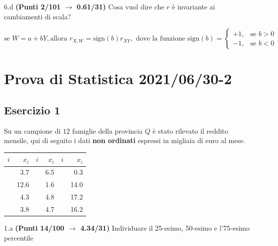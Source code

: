 \documentclass[
  11pt,
]{book}
\theoremstyle{mytheoremstyle}
\theoremstyle{mydefstyle}
\newenvironment{sol}
  {
  \begin{tcolorbox}[enhanced,breakable,arc=0.1mm,boxrule=1pt,colback=white,colframe=iblue,
  title=\bf \fontfamily{lmss}\selectfont \hspace{.5 cm} Soluzione,drop fuzzy shadow]

}{
\end{tcolorbox}
  }
\begin{document}
6.d \textbf{(Punti 2/101 \(\rightarrow\) 0.61/31)} Cosa vuol dire che \(r\) è invariante ai cambiamenti di scala?

\begin{sol}
\[\text{se }W=a+bY,\text{allora }r_{X,W}=\text{sign}(b) r_{XY},\text{ dove la funzione sign}(b)=
\begin{cases}+1, &\text{se $b>0$}\\
             -1, &\text{se $b<0$}
\end{cases}\]

\end{sol}

\section{Prova di Statistica 2021/06/30-2}\label{prova-di-statistica-20210630-2}

\subsection{Esercizio 1}\label{esercizio-1-7}

Su un campione di \(12\) famiglie della provincia \(Q\) è stato rilevato il reddito mensile, qui di seguito i dati \textbf{non ordinati} espressi in migliaia di euro al mese.

\begin{table}[H]
\centering
\begin{tabular}{>{\raggedright\arraybackslash}p{3em}r>{\raggedright\arraybackslash}p{3em}r>{\raggedright\arraybackslash}p{3em}r}
\toprule
$i$ & $x_{i}$ & $i$ & $x_{i}$ & $i$ & $x_{i}$\\
\midrule
\cellcolor[HTML]{E6E6E6}{$1$} & 3.7 & \cellcolor[HTML]{E6E6E6}{$5$} & 6.5 & \cellcolor[HTML]{E6E6E6}{$9$} & 0.3\\
\cellcolor[HTML]{E6E6E6}{$2$} & 12.6 & \cellcolor[HTML]{E6E6E6}{$6$} & 1.6 & \cellcolor[HTML]{E6E6E6}{$10$} & 14.0\\
\cellcolor[HTML]{E6E6E6}{$3$} & 4.3 & \cellcolor[HTML]{E6E6E6}{$7$} & 4.8 & \cellcolor[HTML]{E6E6E6}{$11$} & 17.2\\
\cellcolor[HTML]{E6E6E6}{$4$} & 3.8 & \cellcolor[HTML]{E6E6E6}{$8$} & 4.7 & \cellcolor[HTML]{E6E6E6}{$12$} & 16.2\\
\bottomrule
\end{tabular}
\end{table}

1.a \textbf{(Punti 14/100 \(\rightarrow\) 4.34/31)} Individuare il 25-esimo, 50-esimo e l'75-esimo percentile
\end{document}
